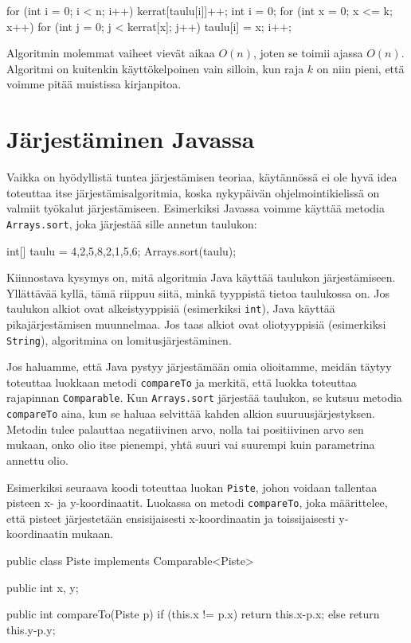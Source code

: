 \begin{code}
for (int i = 0; i < n; i++) {
    kerrat[taulu[i]]++;
}
int i = 0;
for (int x = 0; x <= k; x++) {
    for (int j = 0; j < kerrat[x]; j++) {
        taulu[i] = x;
        i++;
    }
}
\end{code}

Algoritmin molemmat vaiheet vievät aikaa $O(n)$,
joten se toimii ajassa $O(n)$.
Algoritmi on kuitenkin käyttökelpoinen vain silloin,
kun raja $k$ on niin pieni, että voimme pitää
muistissa kirjanpitoa.

\section{Järjestäminen Javassa}

Vaikka on hyödyllistä tuntea järjestämisen teoriaa,
käytännössä ei ole hyvä idea toteuttaa itse
järjestämisalgoritmia, koska nykypäivän ohjelmointikielissä
on valmiit työkalut järjestämiseen.
Esimerkiksi Javassa voimme käyttää metodia \texttt{Arrays.sort},
joka järjestää sille annetun taulukon:

\begin{code}
int[] taulu = {4,2,5,8,2,1,5,6};
Arrays.sort(taulu);
\end{code}

Kiinnostava kysymys on, mitä algoritmia Java käyttää
taulukon järjes\-tämiseen.
Yllättävää kyllä, tämä riippuu siitä, minkä tyyppistä tietoa
taulukossa on.
Jos taulukon alkiot ovat alkeistyyppisiä
(esimerkiksi \texttt{int}), Java käyttää 
pikajärjestämisen muunnelmaa.
Jos taas alkiot ovat oliotyyppisiä
(esimerkiksi \texttt{String}),
algoritmina on lomitusjärjestäminen.

Jos haluamme, että Java pystyy järjestämään omia olioitamme,
meidän täytyy toteuttaa luokkaan metodi \texttt{compareTo} ja
merkitä, että luokka toteuttaa rajapinnan \texttt{Comparable}.
Kun \texttt{Arrays.sort} järjestää taulukon,
se kutsuu metodia \texttt{compareTo} aina, kun se haluaa selvittää
kahden alkion suuruusjärjestyksen.
Metodin tulee palauttaa negatiivinen arvo, nolla tai positiivinen arvo
sen mukaan, onko olio itse pienempi, yhtä suuri vai suurempi
kuin parametrina annettu olio.

Esimerkiksi seuraava koodi toteuttaa luokan \texttt{Piste},
johon voidaan tallentaa pisteen x- ja y-koordinaatit.
Luokassa on metodi \texttt{compareTo}, joka määrittelee,
että pisteet järjestetään ensisijaisesti x-koordinaatin ja
toissijaisesti y-koordinaatin mukaan.

\begin{code}
public class Piste implements Comparable<Piste> {
    public int x, y;

    public int compareTo(Piste p) {
        if (this.x != p.x) return this.x-p.x;
        else return this.y-p.y;
    }
}
\end{code}

